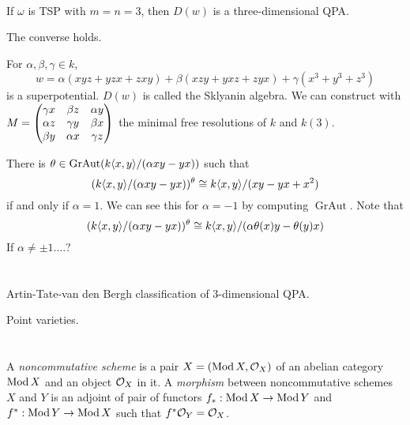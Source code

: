 \documentclass{../../../small}
\newcommand{\GrAut}{\operatorname{GrAut}}
\begin{document}
\begin{thm}\,
\begin{parts}
\item If $\omega$ is TSP with $m=n=3$, then $D(w)$ is a three-dimensional QPA.
\item The converse holds.
\end{parts}
\end{thm}


\begin{ex}
For $\alpha,\beta,\gamma\in k$,
\[w=\alpha(xyz+yzx+zxy)+\beta(xzy+yxz+zyx)+\gamma(x^3+y^3+z^3)\]
is a superpotential.
$D(w)$ is called the Sklyanin algebra.
We can construct with $M=\begin{pmatrix}\gamma x&\beta z&\alpha y\\\alpha z&\gamma y&\beta x\\\beta y&\alpha x&\gamma z\end{pmatrix}$ the minimal free resolutions of $k$ and $k(3)$.
\end{ex}


There is $\theta\in\GrAut(k\<x,y\>/(\alpha xy-yx))$ such that
\[(k\langle x,y\rangle/(\alpha xy-yx))^\theta\cong k\langle x,y\rangle/(xy-yx+x^2)\]
if and only if $\alpha=1$.
We can see this for $\alpha=-1$ by computing $\GrAut$.
Note that
\[(k\langle x,y\rangle/(\alpha xy-yx))^\theta\cong k\langle x,y\rangle/(\alpha\theta(x)y-\theta(y)x)\]
If $\alpha\ne\pm1$....?


\newpage
\section{}

Artin-Tate-van den Bergh classification of 3-dimensional QPA.

Point varieties.


\newpage
\section{}

\subsection{}

\begin{defn}
A \emph{noncommutative scheme} is a pair $X=(\operatorname{Mod} X,\mathcal{O}_X)$ of an abelian category $\operatorname{Mod} X$ and an object $\mathcal{O}_X$ in it.
A \emph{morphism} between noncommutative schemes $X$ and $Y$ is an adjoint of pair of functors $f_*:\operatorname{Mod} X\to\operatorname{Mod} Y$ and $f^*:\operatorname{Mod} Y\to\operatorname{Mod} X$ such that $f^*\mathcal{O}_Y=\mathcal{O}_X$.
\end{defn}
\end{document}
